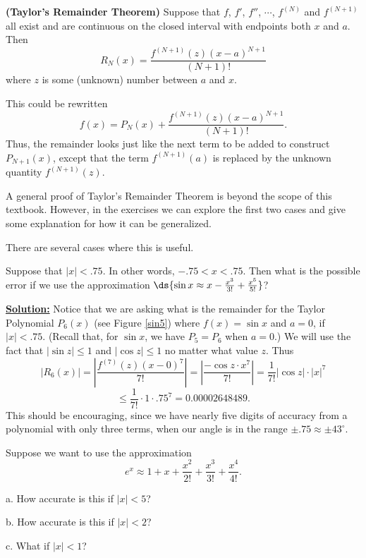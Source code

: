 \begin{theorem} 
{\bf(Taylor's Remainder Theorem)} Suppose
that $f$, $f'$, $f''$, $\cdots$, $f^{(N)}$ and $f^{(N+1)}$ all
exist and are continuous on the closed interval with endpoints
both $x$ and $a$.  Then
\begin{equation}R_N(x)=\frac{f^{(N+1)}(z)(x-a)^{N+1}}{(N+1)!}
\label{RemainderTheorem}\end{equation} 
where $z$ is some (unknown) number between $a$ and $x$.
\end{theorem}
This could be rewritten
$$f(x)=P_N(x)+\frac{f^{(N+1)}(z)(x-a)^{N+1}}{(N+1)!}.$$
Thus, the remainder looks just like the next term to be added
to construct $P_{N+1}(x)$, except that the term
$f^{(N+1)}(a)$ is replaced by the unknown quantity
$f^{(N+1)}(z)$.

A general proof of Taylor's Remainder Theorem is beyond the scope of
this textbook.  However, in the exercises we can explore 
the first two cases and give some explanation for how it can
be generalized.



There are several cases where this is useful. 

\bex Suppose that $|x|<.75$.
In other words, $-.75<x<.75.$  Then what is the possible error
if we use the approximation 
$\ds{\sin x\approx x-\frac{x^3}{3!}+\frac{x^5}{5!}}$?
\medskip

\underline{\bf Solution:} Notice that we are asking what
is the remainder for the Taylor Polynomial $P_6(x)$ (see
Figure \ref{sin5}) where
$f(x)=\sin x$ and $a=0$, if $|x|<.75.$
(Recall that, for $\sin x$, we have $P_5=P_6$ when $a=0$.) 
We will use the fact that $|\sin z|\le1$ and
$|\cos z|\le 1$ no matter what value $z$.  Thus
$$\left|R_6(x)\right|=\left|\frac{f^{(7)}(z)(x-0)^7}{7!}\right|
=\left|\frac{-\cos z\cdot x^7}{7!}\right|
=\frac1{7!}|\cos z|\cdot|x|^7 $$ 
$$\le \frac1{7!}\cdot1\cdot.75^7=0.00002648489. $$
This should be encouraging, since we have nearly five digits of
accuracy from a polynomial with only three terms, when our angle
is in the range $\pm.75\approx\pm43^\circ$.
\eex

\bex Suppose we want to use the approximation 
$$e^x\approx1+x+\frac{x^2}{2!}+\frac{x^3}{3!}+
\frac{x^4}{4!}.$$ 
\begin{description}
\item a.  How accurate is this if $|x|<5$?
\item b.  How accurate is this if $|x|<2$?
\item c.  What if $|x|<1$? 
\end{description}


